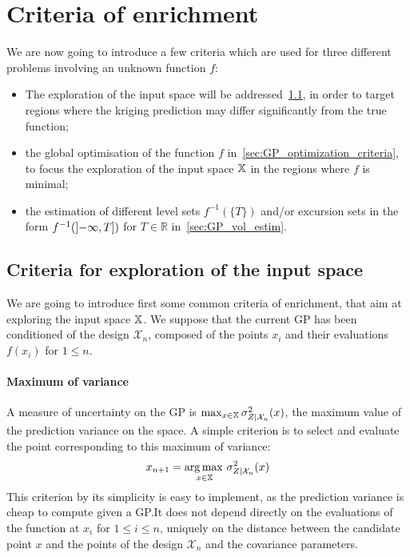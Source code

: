 \documentclass[../../Main_ManuscritThese.tex]{subfiles}
\begin{document}
\section{Criteria of enrichment}

We are now going to introduce a few criteria which are used for three
different problems involving an unknown function $f$:
\begin{itemize}
\item The exploration of the input space will be
  addressed~\cref{sec:exploration_criteria}, in order to target
  regions where the kriging prediction may differ significantly from
  the true function;
\item the global optimisation of the function $f$
  in~\cref{sec:GP_optimization_criteria}, to focus the exploration of
  the input space $\mathbb{X}$ in the regions where $f$ is minimal;
\item the estimation of different level sets $f^{-1}(\{T\})$ and/or
  excursion sets in the form
  $f^{-1}(\interval[open left]{-\infty}{T})$ for $T\in\mathbb{R}$
  in~\cref{sec:GP_vol_estim}.
\end{itemize}

\subsection{Criteria for exploration of the input space}
\label{sec:exploration_criteria}
We are going to introduce first some common criteria of enrichment,
that aim at exploring the input space $\mathbb{X}$.  We suppose that the
current GP has been conditioned of the design $\mathcal{X}_n$,
composed of the points $x_i$ and their evaluations $f(x_i)$ for
$1\leq n$.

\paragraph{Maximum of variance}
A measure of uncertainty on the GP is
$\max_{x\in\mathbb{X}} \sigma_{Z \mid \mathcal{X}_n}^2(x)$, the maximum
value of the prediction variance on the space. A simple criterion is
to select and evaluate the point corresponding to this maximum of
variance:
\begin{equation}
  x_{n+1} = \operatorname*{arg\,max \,}_{x \in \mathbb{X}} \sigma^2_{Z \mid \mathcal{X}_n}(x)
\end{equation}
This criterion by its simplicity is easy to implement, as the
prediction variance is cheap to compute given a GP.\@ It does not
depend directly on the evaluations of the function at $x_i$ for
$1\leq i\leq n$, uniquely on the distance between the candidate point
$x$ and the points of the design $\mathcal{X}_n$ and the covariance
parameters.
\end{document}
